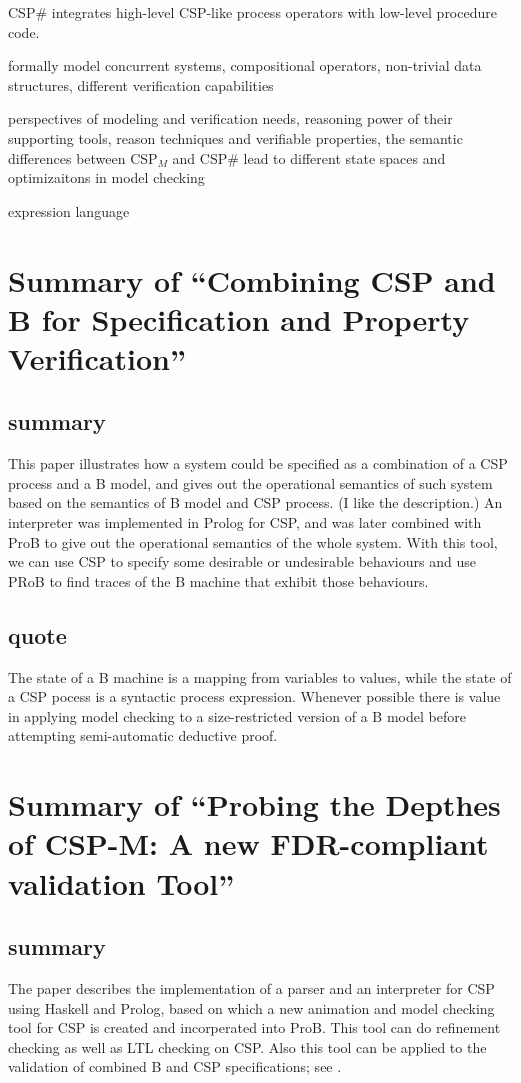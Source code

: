 \documentclass{llncs}
\newcommand{\cspm}{CSP$_M$}
\newcommand{\csps}{CSP\#}
\begin{document}
\csps{} integrates high-level CSP-like process operators with low-level
procedure code.

formally model concurrent systems, compositional operators, non-trivial data
structures, different verification capabilities

perspectives of modeling and verification needs, reasoning power of their
supporting tools, reason techniques and verifiable properties, the semantic
differences between \cspm{} and \csps{} lead to different state spaces and
optimizaitons in model checking

expression language


\section{Summary of ``Combining CSP and B for Specification and 
Property Verification''\cite{Butler2005Combining}}
\subsection{summary}
This paper illustrates how a system could be specified as a combination of a CSP
process and a B model, and gives out the operational semantics of such system
based on the semantics of B model and CSP process. (I like the description.)
An interpreter was implemented in Prolog for CSP, and was later combined with
ProB to give out the operational semantics of the whole system. With this tool,
we can use CSP to specify some desirable or undesirable behaviours and use PRoB
to find traces of the B machine that exhibit those behaviours.


\subsection{quote}
The state of a B machine is a mapping from variables to values, 
while the state of a CSP pocess is a syntactic process expression.
Whenever possible there is value in applying model checking to a size-restricted
version of a B model before attempting semi-automatic deductive proof.

\section{Summary of ``Probing the Depthes of CSP-M: A new FDR-compliant
validation Tool''\cite{Leuschel08}}
  \label{section:prob_csp}
\subsection{summary}
The paper describes the implementation of a parser and an interpreter for CSP
using Haskell and Prolog, based on which a new animation and model checking tool
for CSP is created and incorperated into ProB. This tool can do refinement
checking as well as LTL checking on CSP. Also this tool can be applied to the
validation of combined B and CSP specifications; see \cite{Butler2005Combining}.
\end{document}
